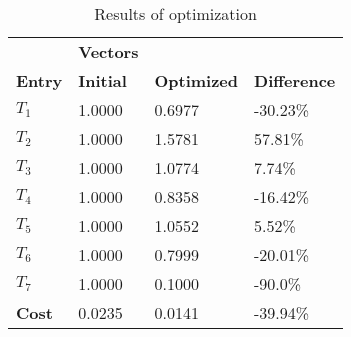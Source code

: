 \begin{table}[H]
\centering
\begin{tabular}{llll}
\textbf{}      & \cellcolor[HTML]{EFEFEF}\textbf{Vectors} & \textbf{} & \textbf{}         \\
\rowcolor[HTML]{EFEFEF} 
\textbf{Entry} & \textbf{Initial} & \textbf{Optimized} & \textbf{Difference} \\
$T_1$ & 1.0000 & 0.6977 & -30.23\% \\ 
$T_2$ & 1.0000 & 1.5781 & 57.81\% \\ 
$T_3$ & 1.0000 & 1.0774 & 7.74\% \\ 
$T_4$ & 1.0000 & 0.8358 & -16.42\% \\ 
$T_5$ & 1.0000 & 1.0552 & 5.52\% \\ 
$T_6$ & 1.0000 & 0.7999 & -20.01\% \\ 
$T_7$ & 1.0000 & 0.1000 & -90.0\% \\ 
\rowcolor[HTML]{EFEFEF} 
\textbf{Cost}  & 0.0235 & 0.0141 & -39.94\% \\ 
\end{tabular}
\caption{Results of optimization}
\label{tab:OptimizationAnalysis}
\end{table}